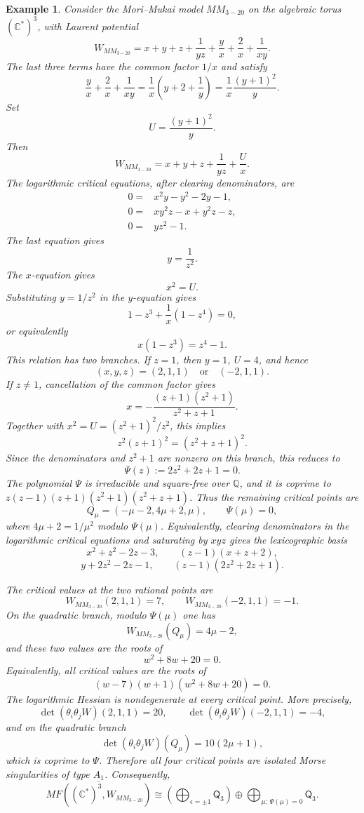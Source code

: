 \documentclass[11pt]{amsart}
\newtheorem{example}{Example}[section]
\newcommand{\MorseCat}[1]{\mathsf{Q}_{#1}}
\begin{document}
\begin{example}
Consider the Mori--Mukai model $MM_{3-20}$ on the algebraic torus
$(\mathbb{C}^*)^3$, with Laurent potential
\[
W_{MM_{3-20}}=x+y+z+\frac{1}{yz}+\frac{y}{x}
+\frac{2}{x}+\frac{1}{xy}.
\]
The last three terms have the common factor $1/x$ and satisfy
\[
\frac{y}{x}+\frac{2}{x}+\frac{1}{xy}
=\frac{1}{x}\left(y+2+\frac{1}{y}\right)
=\frac{1}{x}\frac{(y+1)^2}{y}.
\]
Set
\[
U=\frac{(y+1)^2}{y}.
\]
Then
\[
W_{MM_{3-20}}=x+y+z+\frac{1}{yz}+\frac{U}{x}.
\]
The logarithmic critical equations, after clearing denominators, are
\begin{align*}
0={}&x^2y-y^2-2y-1, \\
0={}&xy^2z-x+y^2z-z, \\
0={}&yz^2-1.
\end{align*}
The last equation gives
\[
y=\frac{1}{z^2}.
\]
The $x$-equation gives
\[
x^2=U.
\]
Substituting $y=1/z^2$ in the $y$-equation gives
\[
1-z^3+\frac{1}{x}(1-z^4)=0,
\]
or equivalently
\[
x(1-z^3)=z^4-1.
\]
This relation has two branches. If $z=1$, then $y=1$, $U=4$, and hence
\[
(x,y,z)=(2,1,1)\quad\text{or}\quad(-2,1,1).
\]
If $z\ne1$, cancellation of the common factor gives
\[
x=-\frac{(z+1)(z^2+1)}{z^2+z+1}.
\]
Together with $x^2=U=(z^2+1)^2/z^2$, this implies
\[
z^2(z+1)^2=(z^2+z+1)^2.
\]
Since the denominators and $z^2+1$ are nonzero on this branch, this reduces to
\[
\Psi(z):=2z^2+2z+1=0.
\]
The polynomial $\Psi$ is irreducible and square-free over $\mathbb{Q}$, and it
is coprime to $z(z-1)(z+1)(z^2+1)(z^2+z+1)$. Thus the remaining critical
points are
\[
Q_\mu=(-\mu-2,4\mu+2,\mu),
\qquad
\Psi(\mu)=0,
\]
where $4\mu+2=1/\mu^2$ modulo $\Psi(\mu)$. Equivalently, clearing denominators
in the logarithmic critical equations and saturating by $xyz$ gives the
lexicographic basis
\[
x^2+z^2-2z-3,
\qquad
(z-1)(x+z+2),
\]
\[
y+2z^2-2z-1,
\qquad
(z-1)(2z^2+2z+1).
\]

The critical values at the two rational points are
\[
W_{MM_{3-20}}(2,1,1)=7,
\qquad
W_{MM_{3-20}}(-2,1,1)=-1.
\]
On the quadratic branch, modulo $\Psi(\mu)$ one has
\[
W_{MM_{3-20}}(Q_\mu)=4\mu-2,
\]
and these two values are the roots of
\[
w^2+8w+20=0.
\]
Equivalently, all critical values are the roots of
\[
(w-7)(w+1)(w^2+8w+20)=0.
\]
The logarithmic Hessian is nondegenerate at every critical point. More
precisely,
\[
\det(\theta_i\theta_jW)(2,1,1)=20,
\qquad
\det(\theta_i\theta_jW)(-2,1,1)=-4,
\]
and on the quadratic branch
\[
\det(\theta_i\theta_jW)(Q_\mu)=10(2\mu+1),
\]
which is coprime to $\Psi$. Therefore all four critical points are isolated
Morse singularities of type $A_1$. Consequently,
\[
\overline{MF((\mathbb{C}^*)^3,W_{MM_{3-20}})}
\cong \left(\bigoplus_{\epsilon=\pm1}\MorseCat{3}\right) \oplus \bigoplus_{\mu:\,\Psi(\mu)=0}\MorseCat{3}.
\]
\end{example}
\end{document}
